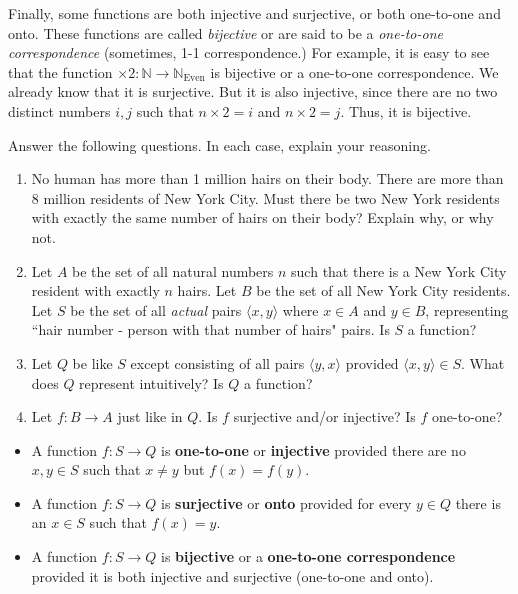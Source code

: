 Finally, some functions are both injective and surjective, or both one-to-one and onto. These functions are called \textit{bijective} or are said to be a \textit{one-to-one correspondence} (sometimes, 1-1 correspondence.) For example, it is easy to see that the function $\times2: \mathbb{N}\to \mathbb{N}_\text{Even}$ is bijective or a one-to-one correspondence. We already know that it is surjective. But it is also injective, since there are no two distinct numbers $i, j$ such that $n\times 2=i$ and $n\times 2=j$. Thus, it is bijective. 

\begin{exc}
	Answer the following questions. In each case, explain your reasoning. 
\begin{enumerate}
	\item No human has more than 1 million hairs on their body. There are more than 8 million residents of New York City. Must there be two New York residents with exactly the same number of hairs on their body? Explain why, or why not. 
	\item Let $A$ be the set of all natural numbers $n$ such that there is a New York City resident with exactly $n$ hairs. Let $B$ be the set of all New York City residents. Let $S$ be the set of all \textit{actual} pairs $\langle x, y \rangle$ where $x \in A$ and $y \in B$, representing ``hair number - person with that number of hairs" pairs. Is $S$ a function?  
	\item Let $Q$ be like $S$ except consisting of all pairs $\langle y, x \rangle$ provided $\langle x, y \rangle \in S$. What does $Q$ represent intuitively? Is $Q$ a function? 
	\item Let $f: B \to A$ just like in $Q$. Is $f$ surjective and/or injective? Is $f$ one-to-one? 
\end{enumerate}
\end{exc}

\begin{defn} \leavevmode
\begin{itemize} 
\item A function $f: S \to Q$ is \textbf{one-to-one} or \textbf{injective} provided there are no $x, y \in S$ such that $x \neq y$ but $f(x)=f(y)$. 
\item A function $f: S \to Q$ is \textbf{surjective} or \textbf{onto} provided for every $y \in Q$ there is an $x \in S$ such that $f(x)=y$. 
\item A function $f: S \to Q$ is \textbf{bijective} or a \textbf{one-to-one correspondence} provided it is both injective and surjective (one-to-one and onto). 
\end{itemize}
\end{defn}

